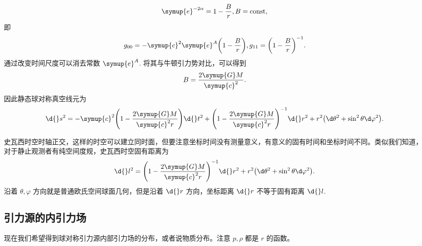 \documentclass[UTF8, 12pt, a4paper, oneside, onecolumn, fontset=none]{ctexart}
\begin{document}
\begin{equation}
\symup{e}^{-2\alpha}=1-\frac{B}{r}, B=\mathrm{const},
\end{equation}
即
\begin{equation}
g_{00}=-\symup{c}^{2}\symup{e}^{A}\mleft(1-\frac{B}{r}\mright), g_{11}=\mleft(1-\frac{B}{r}\mright)^{-1}.
\end{equation}
通过改变时间尺度可以消去常数 $\symup{e}^{A}$. 将其与牛顿引力势对比，可以得到
\begin{equation}
B=\frac{2\symup{G}M}{\symup{c}^{2}}.
\end{equation}
因此静态球对称真空线元为
\begin{equation}
\d{}s^{2}=-\symup{c}^{2}\mleft(1-\frac{2\symup{G}M}{\symup{c}^{2}r}\mright)\d{}t^{2}+\mleft(1-\frac{2\symup{G}M}{\symup{c}^{2}r}\mright)^{-1}\d{}r^{2}+r^{2}\mleft(\d\theta^{2}+\sin^{2}{\theta}\d\varphi^{2}\mright).
\end{equation}

史瓦西时空时轴正交，这样的时空可以建立同时面，但要注意坐标时间没有测量意义，有意义的固有时间和坐标时间不同。类似我们知道，对于静止观测者有纯空间度规，史瓦西时空固有距离为
\begin{equation}
\d{}l^{2}=\mleft(1-\frac{2\symup{G}M}{\symup{c}^{2}r}\mright)^{-1}\d{}r^{2}+r^{2}\mleft(\d\theta^{2}+\sin^{2}{\theta}\d\varphi^{2}\mright).
\end{equation}
沿着 $\theta,\varphi$ 方向就是普通欧氏空间球面几何，但是沿着 $\d{}r$ 方向，坐标距离 $\d{}r$ 不等于固有距离 $\d{}l$.

\subsection{引力源的内引力场}
现在我们希望得到球对称引力源内部引力场的分布，或者说物质分布。注意 $p,\rho$ 都是 $r$ 的函数。
\end{document}
